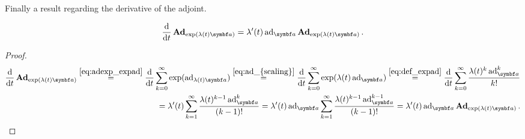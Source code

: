 Finally a result regarding the derivative of the adjoint.

\begin{lemma}
  \label{lem:d_bad_exp}
  \begin{equation}
    \frac{\mathrm{d}}{\mathrm{d}t} \bAd_{\exp(\lambda(t) \a)} = \lambda'(t) \ad_{\a} \bAd_{\exp(\lambda(t) \a)}.
  \end{equation}
\end{lemma}
\begin{proof}
  \begin{equation}
    \begin{aligned}
      \frac{\mathrm{d}}{\mathrm{d}t} \bAd_{\exp(\lambda(t) \a)}
      \overset{\eqref{eq:adexp_expad}}= \frac{\mathrm{d}}{\mathrm{d}t} \sum_{k = 0}^\infty \exp(\ad_{\lambda(t) \a})
      \overset{\eqref{eq:ad_{scaling}}}= \frac{\mathrm{d}}{\mathrm{d}t} \sum_{k = 0}^\infty \exp(\lambda(t) \ad_{\a})
      \overset{\eqref{eq:def_expad}}= \frac{\mathrm{d}}{\mathrm{d}t} \sum_{k=0}^{\infty} \frac{\lambda(t)^{k} \ad_{\a}^{k}}{k!} \\
      = \lambda'(t) \sum_{k=1}^{\infty} \frac{\lambda(t)^{k-1} \ad_{\a}^{k}}{(k-1)!} = \lambda'(t) \ad_{\a} \sum_{k=1}^{\infty} \frac{\lambda(t)^{k-1} \ad_{\a}^{k-1}}{(k-1)!} = \lambda'(t) \ad_{\a} \bAd_{\exp(\lambda(t) \a)}.
    \end{aligned}
  \end{equation}
\end{proof}
